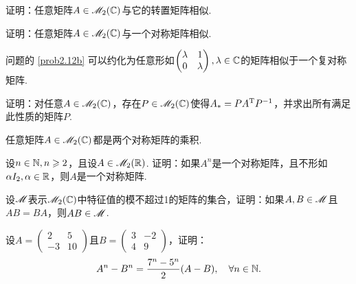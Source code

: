 \begin{mybox}
\begin{problem}[两类特殊的相似矩阵.]
  \begin{enum}
    \item 证明：任意矩阵$A\in\mathscr M_2(\mathbb C)$与它的转置矩阵相似.
    \item\label{prob2.12b} 证明：任意矩阵$A\in\mathscr M_2(\mathbb C)$与一个对称矩阵相似.
  \end{enum}
  \begin{nota}
     问题的 \ref{prob2.12b} 可以约化为任意形如$\begin{pmatrix}
          \lambda & 1 \\
          0 & \lambda
        \end{pmatrix},\lambda\in\mathbb C$的矩阵相似于一个复对称矩阵.
  \end{nota}
\end{problem}
\end{mybox}

\begin{mybox}
  \begin{problem}[转置矩阵与伴随矩阵矩阵相似.]

    证明：对任意$A\in\mathscr M_2(\mathbb C)$，存在$P\in\mathscr M_2(\mathbb C)$使得$A_\ast=PA^{\mathrm T} P^ {-1}$，并求出所有满足此性质的矩阵$P$.
  \end{problem}
\end{mybox}

\begin{mybox}
  \begin{problem}
    任意矩阵$A\in\mathscr M_2(\mathbb C)$都是两个对称矩阵的乘积.
  \end{problem}
\end{mybox}

\begin{problem}
  设$n\in\mathbb N,n\geqslant2$，且设$A\in\mathscr M_2(\mathbb R)$. 证明：如果$A^n$是一个对称矩阵，且不形如$\alpha I_2,\alpha\in\mathbb R$，则$A$是一个对称矩阵.
\end{problem}

\begin{problem}
  设$\mathscr M$表示$\mathscr M_2(\mathbb C)$中特征值的模不超过1的矩阵的集合，证明：如果$A,B\in\mathscr M$且$AB=BA$，则$AB\in\mathscr M$.
\end{problem}

\begin{problem}
  设$A=\begin{pmatrix}
    2 & 5 \\
    -3 & 10
  \end{pmatrix}$且$B=\begin{pmatrix}
    3 & -2 \\
    4 & 9
  \end{pmatrix}$，证明：
  \[
    A^n - B^n = \frac{7^n-5^n}2(A-B),\quad \forall n\in\mathbb N.
  \]
\end{problem}

